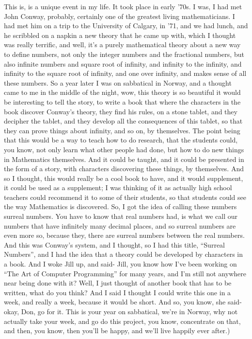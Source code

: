 \documentclass[]{article}
\begin{document}
This is, is a unique event in my life. It took place in early '70s. I
was, I had met John Conway, probably, certainly one of the greatest
living mathematicians. I had met him on a trip to the University of
Calgary, in '71, and we had lunch, and he scribbled on a napkin a new
theory that he came up with, which I thought was really terrific, and
well, it's a purely mathematical theory about a new way to define
numbers, not only the integer numbers and the fractional numbers, but
also infinite numbers and square root of infinity, and infinity to the
infinity, and infinity to the square root of infinity, and one over
infinity, and makes sense of all these numbers. So a year later I was on
sabbatical in Norway, and a thought came to me in the middle of the
night, wow, this theory is so beautiful it would be interesting to tell
the story, to write a book that where the characters in the book
discover Conway's theory, they find his rules, on a stone tablet, and
they decipher the tablet, and they develop all the consequences of this
tablet, so that they can prove things about infinity, and so on, by
themselves. The point being that this would be a way to teach how to do
research, that the students could, you know, not only learn what other
people had done, but how to do new things in Mathematics themselves. And
it could be taught, and it could be presented in the form of a story,
with characters discovering these things, by themselves. And so I
thought, this would really be a cool book to have, and it would
supplement, it could be used as a supplement; I was thinking of it as
actually high school teachers could recommend it to some of their
students, so that students could see the way Mathematics is discovered.
So, I got the idea of calling these numbers surreal numbers. You have to
know that real numbers had, is what we call our numbers that have
infinitely many decimal places, and so surreal numbers are even more so,
because they, there are surreal numbers between the real numbers. And
this was Conway's system, and I thought, so I had this title, ``Surreal
Numbers'', and I had the idea that a theory could be developed by
characters in a book. And I woke Jill up, and said- Jill, you know how
I've been working on ``The Art of Computer Programming'' for many years,
and I'm still not anywhere near being done with it? Well, I just thought
of another book that has to be written, what do you think? And I said I
thought I could write this one in a week, and really a week, because it
would be short. And so, you know, she said- okay, Don, go for it. This
is your year on sabbatical, we're in Norway, why not actually take your
week, and go do this project, you know, concentrate on that, and then,
you know, then you'll be happy, and we'll live happily ever after.)
\end{document}
